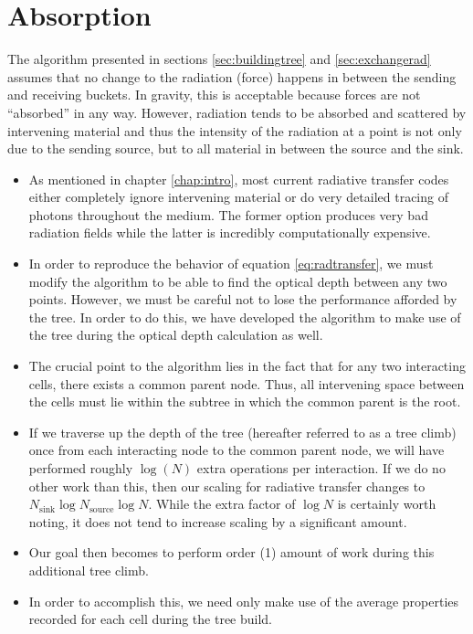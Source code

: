 \section{Absorption}
\label{sec:absorption}

The algorithm presented in sections \ref{sec:buildingtree} and \ref{sec:exchangerad} assumes that no change to the radiation (force) happens in between the sending and receiving buckets. In gravity, this is acceptable because forces are not ``absorbed'' in any way. However, radiation tends to be absorbed and scattered by intervening material and thus the intensity of the radiation at a point is not only due to the sending source, but to all material in between the source and the sink.

\begin{itemize}
\item As mentioned in chapter \ref{chap:intro}, most current radiative transfer codes either completely ignore intervening material or do very detailed tracing of photons throughout the medium. The former option produces very bad radiation fields while the latter is incredibly computationally expensive.
\item In order to reproduce the behavior of equation \ref{eq:radtransfer}, we must modify the algorithm to be able to find the optical depth between any two points. However, we must be careful not to lose the performance afforded by the tree. In order to do this, we have developed the algorithm to make use of the tree during the optical depth calculation as well.
\item The crucial point to the algorithm lies in the fact that for any two interacting cells, there exists a common parent node. Thus, all intervening space between the cells must lie within the subtree in which the common parent is the root.
\item If we traverse up the depth of the tree (hereafter referred to as a tree climb) once from each interacting node to the common parent node, we will have performed roughly $\log(N)$ extra operations per interaction. If we do no other work than this, then our scaling for radiative transfer changes to $N_{\mbox{sink}}\log{N_{\mbox{source}}}\log{N}$. While the extra factor of $\log{N}$ is certainly worth noting, it does not tend to increase scaling by a significant amount.
\item Our goal then becomes to perform order (1) amount of work during this additional tree climb.
\item In order to accomplish this, we need only make use of the average properties recorded for each cell during the tree build.

\end{itemize}
